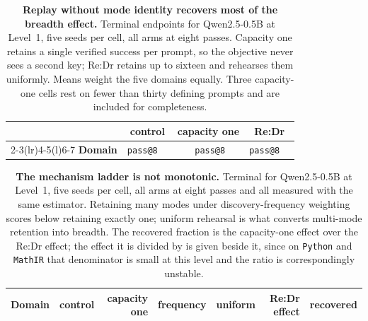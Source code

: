 \begin{table}[!htbp]
  \centering
  \caption{\textbf{Replay without mode identity recovers most of the breadth
  effect.} Terminal endpoints for Qwen2.5-0.5B at Level~1, five seeds per
  cell, all arms at eight passes. Capacity one retains a single verified
  success per prompt, so the objective never sees a second key; Re:Dr retains
  up to sixteen and rehearses them uniformly. Means weight the five domains
  equally. Three capacity-one cells rest on fewer than thirty defining prompts
  and are included for completeness.}
  \label{tab:mode-agnostic-replay}
  \small
  \setlength{\tabcolsep}{5pt}
  \begin{tabular}{@{}l*{6}{r}@{}}
    \toprule
    & \multicolumn{2}{c}{\textbf{control}}
      & \multicolumn{2}{c}{\textbf{capacity one}}
      & \multicolumn{2}{c}{\textbf{Re:Dr}} \\
    \cmidrule(lr){2-3}\cmidrule(lr){4-5}\cmidrule(l){6-7}
    \textbf{Domain} & \texttt{pass@8} & \pmd{} & \texttt{pass@8} & \pmd{}
      & \texttt{pass@8} & \pmd{} \\
    \midrule
    
  \end{tabular}
\end{table}

\begin{table}[!htbp]
  \centering
  \caption{\textbf{The mechanism ladder is not monotonic.} Terminal \pmd{} for
  Qwen2.5-0.5B at Level~1, five seeds per cell, all arms at eight passes and
  all measured with the same estimator. Retaining many modes under
  discovery-frequency weighting scores below retaining exactly one; uniform
  rehearsal is what converts multi-mode retention into breadth. The recovered
  fraction is the capacity-one effect over the Re:Dr effect; the effect it is
  divided by is given beside it, since on \texttt{Python} and \texttt{MathIR}
  that denominator is small at this level and the ratio is correspondingly
  unstable.}
  \label{tab:replay-mechanism-ladder}
  \small
  \setlength{\tabcolsep}{6pt}
  \begin{tabular}{@{}l*{6}{r}@{}}
    \toprule
    \textbf{Domain} & \textbf{control} & \textbf{capacity one}
      & \textbf{frequency} & \textbf{uniform} & \textbf{Re:Dr effect}
      & \textbf{recovered} \\
    \midrule
    
  \end{tabular}
\end{table}


